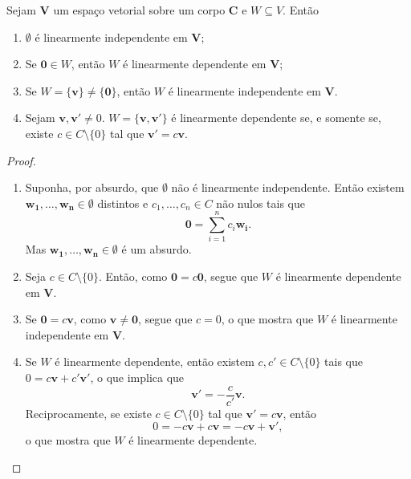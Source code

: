 \begin{prop}
	Sejam $\bm V$ um espaço vetorial sobre um corpo $\bm C$ e $W \subseteq V$. Então
	\begin{enumerate}
	\item $\emptyset$ é linearmente independente em $\bm V$;
	\item Se $\bm 0 \in W$, então $W$ é linearmente dependente em $\bm V$;
	\item Se $W=\{\bm v\}\neq\{\bm 0\}$, então $W$ é linearmente independente em $\bm V$.
	\item Sejam $\bm v,\bm v' \neq 0$. $W = \{\bm v,\bm v'\}$ é linearmente dependente se, e somente se, existe $c \in C \setminus \{0\}$ tal que $\bm v' = c\bm v$.
	\end{enumerate}
\end{prop}
\begin{proof}
	\begin{enumerate}
	\item Suponha, por absurdo, que $\emptyset$ não é linearmente independente. Então existem $\bm{w_1},\ldots,\bm{w_n} \in \emptyset$ distintos e $c_1,\ldots,c_n \in C$ não nulos tais que
	\begin{equation*}
	\bm 0 = \sum_{i=1}^n c_i\bm{w_i}.
	\end{equation*}
Mas $\bm{w_1},\ldots,\bm{w_n} \in \emptyset$ é um absurdo.
	\item Seja $c \in C \setminus \{0\}$. Então, como $\bm 0 = c \bm 0$, segue que $W$ é linearmente dependente em $\bm V$.
	\item Se $\bm 0 = c\bm v$, como $\bm v \neq \bm 0$, segue que $c=0$, o que mostra que $W$ é linearmente independente em $\bm V$.
	\item Se $W$ é linearmente dependente, então existem $c,c' \in C \setminus \{0\}$ tais que $0 = c\bm v + c' \bm v'$, o que implica que
		\begin{equation*}
		\bm v' = -\frac{c}{c'} \bm v.
		\end{equation*}
Reciprocamente, se existe $c \in C \setminus \{0\}$ tal que $\bm v' = c\bm v$, então
	\begin{equation*}
	0 = -c \bm v +c\bm v = -c \bm v + \bm v',
	\end{equation*}
o que mostra que $W$ é linearmente dependente.
	\end{enumerate}
\end{proof}

